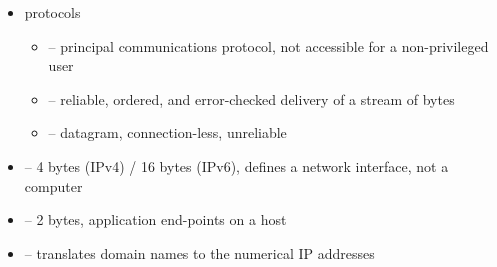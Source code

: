 
\begin{slide}
\begin{itemize}
\item protocols
    \begin{itemize}
    \item {} -- principal communications protocol,
    not accessible for a non-privileged user
    \item {} -- reliable, ordered, and
    error-checked delivery of a stream of bytes
    \item {} -- datagram, connection-less,
    unreliable
    \end{itemize}
\item {} -- 4 bytes (IPv4) / 16 bytes (IPv6), defines a network
interface, not a computer
\item {} -- 2 bytes, application end-points on a host
\item {} --  translates domain names to the
numerical IP addresses
\end{itemize}
\end{slide}

